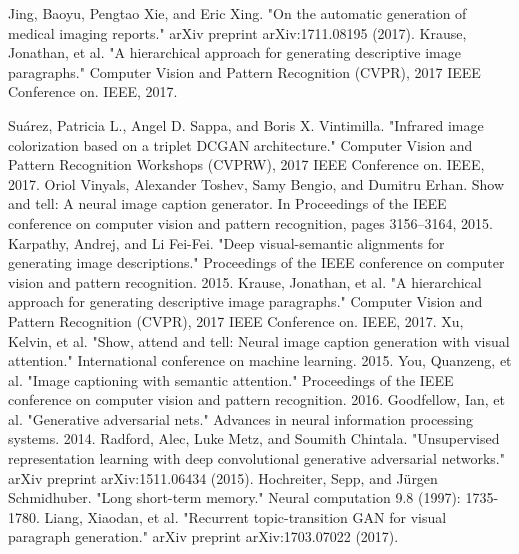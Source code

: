 \documentclass[12pt]{article}
\numberwithin{figure}{section}
\begin{document}
\clearpage
{}
\begin{thebibliography}{}
Jing, Baoyu, Pengtao Xie, and Eric Xing. "On the automatic generation of medical imaging reports." arXiv preprint arXiv:1711.08195 (2017).
Krause, Jonathan, et al. "A hierarchical approach for generating descriptive image paragraphs." Computer Vision and Pattern Recognition (CVPR), 2017 IEEE Conference on. IEEE, 2017.

Suárez, Patricia L., Angel D. Sappa, and Boris X. Vintimilla. "Infrared image colorization based on a triplet DCGAN architecture." Computer Vision and Pattern Recognition Workshops (CVPRW), 2017 IEEE Conference on. IEEE, 2017.
 Oriol Vinyals, Alexander Toshev, Samy Bengio, and
Dumitru Erhan. Show and tell: A neural image
caption generator. In Proceedings of the IEEE conference
on computer vision and pattern recognition,
pages 3156–3164, 2015.
Karpathy, Andrej, and Li Fei-Fei. "Deep visual-semantic alignments for generating image descriptions." Proceedings of the IEEE conference on computer vision and pattern recognition. 2015.
Krause, Jonathan, et al. "A hierarchical approach for generating descriptive image paragraphs." Computer Vision and Pattern Recognition (CVPR), 2017 IEEE Conference on. IEEE, 2017.
Xu, Kelvin, et al. "Show, attend and tell: Neural image caption generation with visual attention." International conference on machine learning. 2015.
You, Quanzeng, et al. "Image captioning with semantic attention." Proceedings of the IEEE conference on computer vision and pattern recognition. 2016.
Goodfellow, Ian, et al. "Generative adversarial nets." Advances in neural information processing systems. 2014.
Radford, Alec, Luke Metz, and Soumith Chintala. "Unsupervised representation learning with deep convolutional generative adversarial networks." arXiv preprint arXiv:1511.06434 (2015).
Hochreiter, Sepp, and Jürgen Schmidhuber. "Long short-term memory." Neural computation 9.8 (1997): 1735-1780.
Liang, Xiaodan, et al. "Recurrent topic-transition GAN for visual paragraph generation." arXiv preprint arXiv:1703.07022 (2017).
\end{thebibliography}
\end{document}
